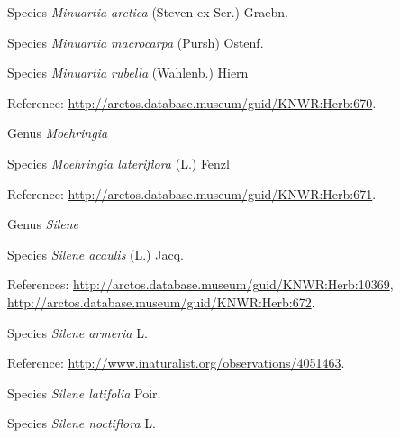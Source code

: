 \documentclass[9pt, article]{memoir}
\begin{document}
\begin{multicols}{2}
\vspace{6pt}\noindent\hspace{36pt}Species \textit{Minuartia arctica} (Steven ex Ser.) Graebn.


\vspace{6pt}\noindent\hspace{36pt}Species \textit{Minuartia macrocarpa} (Pursh) Ostenf.


\vspace{6pt}\noindent\hspace{36pt}Species \textit{Minuartia rubella} (Wahlenb.) Hiern


\vspace{6pt}Reference: 
\url{http://arctos.database.museum/guid/KNWR:Herb:670}.

\vspace{6pt}\noindent\hspace{30pt}Genus \textit{Moehringia}


\vspace{6pt}\noindent\hspace{36pt}Species \textit{Moehringia lateriflora} (L.) Fenzl


\vspace{6pt}Reference: 
\url{http://arctos.database.museum/guid/KNWR:Herb:671}.

\vspace{6pt}\noindent\hspace{30pt}Genus \textit{Silene}


\vspace{6pt}\noindent\hspace{36pt}Species \textit{Silene acaulis} (L.) Jacq.


\vspace{6pt}References: 
\url{http://arctos.database.museum/guid/KNWR:Herb:10369}, 
\url{http://arctos.database.museum/guid/KNWR:Herb:672}.

\vspace{6pt}\noindent\hspace{36pt}Species \textit{Silene armeria} L.


\vspace{6pt}Reference: 
\url{http://www.inaturalist.org/observations/4051463}.

\vspace{6pt}\noindent\hspace{36pt}Species \textit{Silene latifolia} Poir.


\vspace{6pt}\noindent\hspace{36pt}Species \textit{Silene noctiflora} L.



\end{multicols}
\end{document}
